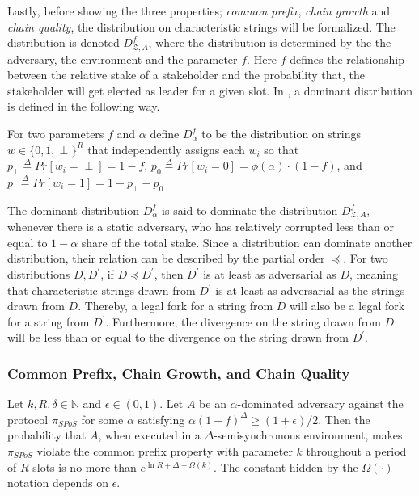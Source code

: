 Lastly, before showing the three properties; \emph{common prefix}, \emph{chain growth} and \emph{chain quality}, the distribution on characteristic strings will be formalized. The distribution is denoted $D_{\mathcal{Z}, A}^f$, where the distribution is determined by the the adversary, the environment and the parameter $f$. Here $f$ defines the relationship between the relative stake of a stakeholder and the probability that, the stakeholder will get elected as leader for a given slot. In \cite{ouroboros-praos}, a dominant distribution is defined in the following way.

\begin{mydef}
\label{def:praos-dom-dist}
For two parameters $f$ and $\alpha$ define $D^f_{\alpha}$ to be the distribution on strings $w \in \{0,1,\perp\}^R$ that independently assigns each $w_i$ so that $p_{\perp} \overset{\Delta}{=} Pr[w_i = \perp] = 1 - f$, $p_0 \overset{\Delta}{=} Pr[w_i = 0] = \phi(\alpha) \cdot (1 - f)$, and $p_1 \overset{\Delta}{=} Pr[w_i = 1] = 1 - p_{\perp} - p_0$
\end{mydef}

The dominant distribution $D_{\alpha}^f$ is said to dominate the distribution $D_{\mathcal{Z},A}^f$, whenever there is a static adversary, who has relatively corrupted less than or equal to $1-\alpha$ share of the total stake. Since a distribution can dominate another distribution, their relation can be described by the partial order $\preceq$. For two distributions $D, D^{'}$, if $D \preceq D^{'}$, then $D^{'}$ is at least as adversarial as $D$, meaning that characteristic strings drawn from $D^{'}$ is at least as adversarial as the strings drawn from $D$. Thereby, a legal fork for a string from $D$ will also be a legal fork for a string from $D^{'}$. Furthermore, the divergence on the string drawn from $D$ will be less than or equal to the divergence on the string drawn from $D^{'}$.

\subsubsection*{Common Prefix, Chain Growth, and Chain Quality}
\label{subsec: praos-cpcgcq}

\begin{theorem}
    Let $k,R,\delta \in \mathbb{N}$ and $\epsilon \in (0,1)$. Let $A$ be an $\alpha$-dominated adversary against the protocol $\pi_{SPoS}$ for some $\alpha$ satisfying $\alpha (1-f)^{\Delta} \geq (1+\epsilon)/2$. Then the probability that $A$, when executed in a $\Delta$-semisynchronous environment, makes $\pi_{SPoS}$ violate the common prefix property with parameter $k$ throughout a period of $R$ slots is no more than $e^{\ln R + \Delta - \Omega(k)}$. The constant hidden by the $\Omega(\cdot)$-notation depends on $\epsilon$.
\end{theorem}

